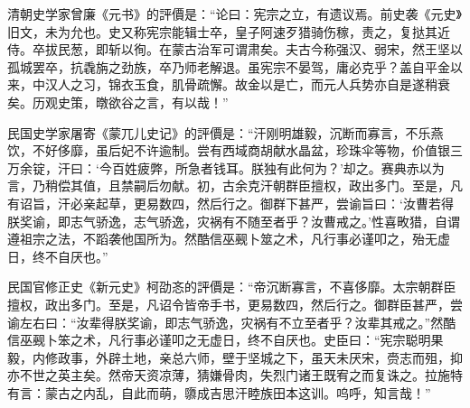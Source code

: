 清朝史学家曾廉《元书》的評價是：“论曰：宪宗之立，有遗议焉。前史袭《元史》旧文，未为允也。史又称宪宗能辑士卒，皇子阿速歹猎骑伤稼，责之，复挞其近侍。卒拔民葱，即斩以徇。在蒙古治军可谓肃矣。夫古今称强汉、弱宋，然王坚以孤城罢卒，抗毳旃之劲族，卒乃师老解退。虽宪宗不晏驾，庸必克乎？盖自平金以来，中汉人之习，锦衣玉食，肌骨疏懈。故金以是亡，而元人兵势亦自是遂稍衰矣。历观史策，暾欲谷之言，有以哉！”

民国史学家屠寄《蒙兀儿史记》的評價是：“汗刚明雄毅，沉断而寡言，不乐燕饮，不好侈靡，虽后妃不许逾制。尝有西域商胡献水晶盆，珍珠伞等物，价值银三万余锭，汗曰：‘今百姓疲弊，所急者钱耳。朕独有此何为？’却之。赛典赤以为言，乃稍偿其值，且禁嗣后勿献。初，古余克汗朝群臣擅权，政出多门。至是，凡有诏旨，汗必亲起草，更易数四，然后行之。御群下甚严，尝谕旨曰：‘汝曹若得朕奖谕，即志气骄逸，志气骄逸，灾祸有不随至者乎？汝曹戒之。’性喜畋猎，自谓遵祖宗之法，不蹈袭他国所为。然酷信巫觋卜筮之术，凡行事必谨叩之，殆无虚日，终不自厌也。”

民国官修正史《新元史》柯劭忞的評價是：“帝沉断寡言，不喜侈靡。太宗朝群臣擅权，政出多门。至是，凡诏令皆帝手书，更易数四，然后行之。御群臣甚严，尝谕左右曰：“汝辈得朕奖谕，即志气骄逸，灾祸有不立至者乎？汝辈其戒之。”然酷信巫觋卜笨之术，凡行事必谨叩之无虚日，终不自厌也。史臣曰：“宪宗聪明果毅，内修政事，外辟土地，亲总六师，壁于坚城之下，虽天未厌宋，赍志而殂，抑亦不世之英主矣。然帝天资凉薄，猜嫌骨肉，失烈门诸王既宥之而复诛之。拉施特有言：蒙古之内乱，自此而萌，隳成吉思汗睦族田本这训。呜呼，知言哉！”


